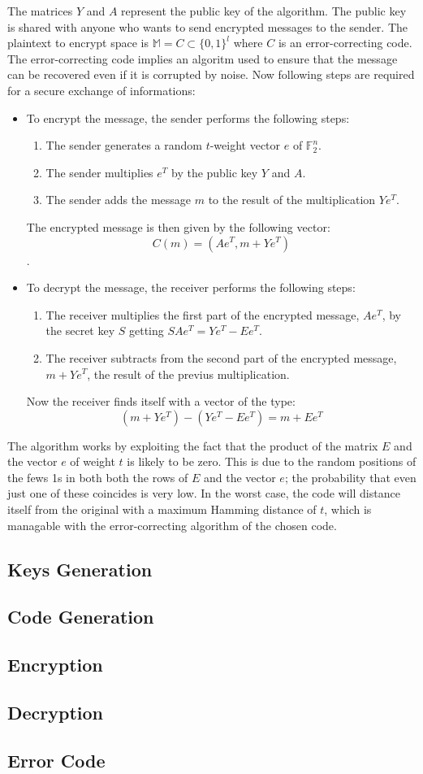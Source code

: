The matrices $Y$ and $A$ represent the public key of the algorithm. The public key is shared with anyone who wants to send encrypted messages to the sender.
The plaintext to encrypt space is $\mathbb{M} = C \subset \{0,1\}^l $ where $C$ is an error-correcting code. The error-correcting code implies an algoritm used to ensure that the message can be recovered even if it is corrupted by noise.
Now following steps are required for a secure exchange of informations:
\begin{itemize}
 \item To encrypt the message, the sender performs the following steps:
    \begin{enumerate}
     \item The sender generates a random $t$-weight vector $e$ of $\mathbb{F}_2^n $.
     \item The sender multiplies $e^T$ by the public key $Y$ and $A$.
     \item The sender adds the message $m$ to the result of the multiplication $Ye^T$.
    \end{enumerate}
    The encrypted message is then given by the following vector: $$C(m) = (Ae^T, m+Ye^T)$$.
    \item To decrypt the message, the receiver performs the following steps:
    \begin{enumerate}
     \item The receiver multiplies the first part of the encrypted message, $Ae^T$, by the secret key $S$ getting $SAe^T = Ye^T-Ee^T $.
     \item The receiver subtracts from the second part of the encrypted message, $m+Ye^T$, the result of the previus multiplication.
    \end{enumerate}
    Now the receiver finds itself with a vector of the type: $$(m+Ye^T) - (Ye^T-Ee^T) = m + Ee^T$$
\end{itemize}
The algorithm works by exploiting the fact that the product of the matrix $E$ and the vector $e$ of weight $t$ is likely to be zero. This is due to the random positions of the fews 1s in both both the rows of $E$ and the vector $e$; the probability that even just one of these coincides is very low.
In the worst case, the code will distance itself from the original with a maximum Hamming distance of $t$, which is managable with the error-correcting algorithm of the chosen code.

\subsection{Keys Generation}
\subsection{Code Generation}
\subsection{Encryption}
\subsection{Decryption}
\subsection{Error Code}
